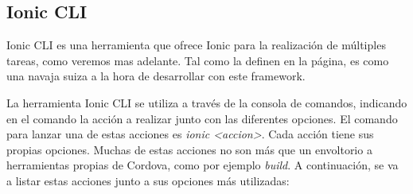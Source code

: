 \subsection{Ionic CLI}

Ionic CLI es una herramienta que ofrece Ionic para la realización de múltiples tareas, como veremos mas adelante. Tal como la definen en la página, es como una navaja suiza a la hora de desarrollar con este framework.

La herramienta Ionic CLI se utiliza a través de la consola de comandos, indicando en el comando la acción a realizar junto con las diferentes opciones. El comando para lanzar una de estas acciones es \emph{ionic <accion>}. Cada acción tiene sus propias opciones. Muchas de estas acciones no son más que un envoltorio a herramientas propias de Cordova, como por ejemplo \emph{build}. A continuación, se va a listar estas acciones junto a sus opciones más utilizadas:

